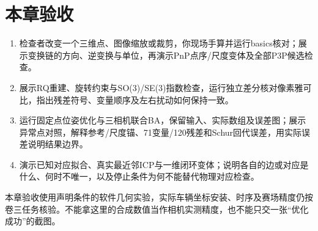 \section{本章验收}
\begin{enumerate}
\item 检查者改变一个三维点、图像缩放或裁剪，你现场手算并运行basics核对；展示变换链的方向、逆变换与单位，再演示PnP点序/尺度变体及全部P3P候选检查。
\item 展示RQ重建、旋转约束与SO(3)/SE(3)指数检查，运行独立差分核对像素雅可比，指出残差符号、变量顺序及左右扰动如何保持一致。
\item 运行固定点位姿优化与三相机联合BA，保留输入、实际数组及误差图；展示异常点对照，解释参考/尺度锚、71变量/120残差和Schur回代误差，用实际误差说明结果边界。
\item 演示已知对应拟合、真实最近邻ICP与一维闭环变体；说明各自的边或对应是什么、何时不唯一，以及停止条件为何不能替代物理对应检查。
\end{enumerate}
本章验收使用声明条件的软件几何实验，实际车辆坐标安装、时序及赛场精度仍按卷三任务核验。不能拿这里的合成数值当作相机实测精度，也不能只交一张“优化成功”的截图。
